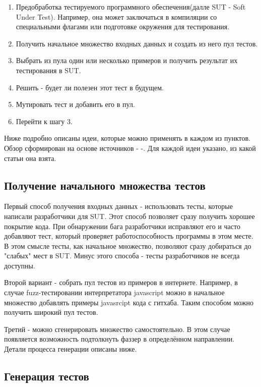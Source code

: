\documentclass[a4paper]{article}
\begin{document}
\begin{enumerate}
    \item Предобработка тестируемого программного обеспечения(далле SUT - Soft Under Test). Например, она может заключаться в компиляции со специальными флагами или подготовке окружения для тестирования. 
    \item Получить начальное множество входных данных и создать из него пул тестов.
    \item Выбрать из пула один или несколько примеров и получить результат их тестирования в SUT.
    \item Решить - будет ли полезен этот тест в будущем.
    \item Мутировать тест и добавить его в пул.
    \item Перейти к шагу 3.
\end{enumerate}

Ниже подробно описаны идеи, которые можно применять в каждом из пунктов. Обзор сформирован на основе источников - \cite{litlink1}-\cite{litlink8}. Для каждой идеи указано, из какой статьи она взята.

\subsection{Получение начального множества тестов}
\indent

Первый способ получения входных данных\cite{litlink3} - использовать тесты, которые написали разработчики для SUT. Этот способ позволяет сразу получить хорошее покрытие кода. При обнаружении бага разработчики исправляют его и часто добавляют тест, который проверяет работоспособность программы в этом месте. В этом смысле тесты, как начальное множество, позволяют сразу добираться до "слабых" мест в SUT. Минус этого способа - тесты разработчиков не всегда доступны.
\indent

Второй вариант\cite{litlink3} - собрать пул тестов из примеров в интернете. Например, в случае fuzz-тестировании интерпретатора javascript можно в начальное множество добавлять примеры javasrcipt кода с гитхаба. Таким способом можно получить широкий пул тестов.
\indent

Третий\cite{litlink2} - можно сгенерировать множество самостоятельно. В этом случае появляется возможность подтолкнуть фаззер в определённом направлении. Детали процесса генерации описаны ниже.

\subsection{Генерация тестов}
\indent
\end{document}
